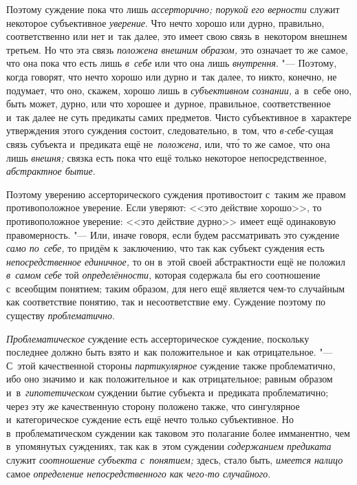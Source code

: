 Поэтому суждение пока что лишь {\em ассерторично; порукой его верности}
служит некоторое субъективное {\em уверение}. Что нечто
хорошо или дурно, правильно, соответственно или нет и~так далее, это имеет
свою связь в~некотором внешнем третьем. Но что эта связь
{\em положена внешним образом,}
это означает то же самое, что она пока что есть лишь
{\em в~себе} или что она лишь {\em внутрення}. "---
Поэтому, когда говорят, что нечто хорошо или дурно и~так
далее, то никто, конечно, не подумает, что оно, скажем, хорошо лишь в
{\em субъективном сознании,}
а~в~себе оно, быть может, дурно, или что хорошее и~дурное,
правильное, соответственное и~так далее не суть предикаты самих предметов.
Чисто субъективное в~характере утверждения этого суждения состоит,
следовательно, в~том, что {\em в-себе-}сущая связь субъекта и~предиката ещё
не~{\em положена,} или, чт\'{о} то же самое, что она лишь {\em внешня;} связка
есть пока что ещё только некоторое непосредственное, {\em абстрактное бытие}.

Поэтому уверению ассерторического суждения противостоит с~таким
же правом противоположное уверение. Если уверяют: <<это действие
хорошо>>, то противоположное уверение: <<это действие дурно>> имеет ещё
одинаковую правомерность. "--- Или, иначе говоря, если будем
рассматривать это суждение {\em само по~себе,} то придём к~заключению, что
так как субъект суждения есть {\em непосредственное единичное,} то он в~этой
своей абстрактности ещё не положил {\em в~самом себе} той {\em определённости,}
которая содержала бы его соотношение с~всеобщим понятием; таким образом,
для него ещё является чем-то случайным как соответствие понятию, так и
несоответствие ему. Суждение поэтому по существу {\em проблематично}.


{\em Проблематическое} суждение есть ассерторическое суждение, поскольку
последнее должно быть взято и~как положительное и~как отрицательное. "---
С~этой качественной стороны {\em партикулярное}
суждение также проблематично, ибо оно значимо и~как
положительное и~как отрицательное; равным образом и~в~{\em гипотетическом}
суждении бытие субъекта и~предиката проблематично; через эту
же качественную сторону положено также, что сингулярное и~категорическое
суждение есть ещё нечто только субъективное. Но в~проблематическом суждении
как таковом это полагание более имманентно, чем в~упомянутых суждениях, так
как в~этом суждении {\em содержанием предиката} служит {\em соотношение
субъекта с~понятием;} здесь, стало быть, {\em имеется налицо} самое
{\em определение непосредственного как чего-то случайного}.

